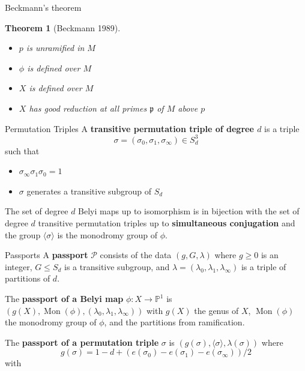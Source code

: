 \documentclass[handout,xcolor=dvipsnames]{beamer}
\theoremstyle{plain}
\newtheorem*{thm}{Theorem}
\newcommand{\PP}{\mathbb P}
\DeclareMathOperator{\Mon}{Mon}
\begin{document}
{\begin{frame}{Beckmann's theorem}
\begin{thm}[Beckmann 1989]
        \pause
        \begin{itemize}
          \item
            $p$ is unramified in $M$
          \item
            $\phi$ is defined over $M$
          \item
            $X$ is defined over $M$
          \item
            $X$ has good reduction at all
            primes $\mathfrak{p}$ of $M$
            above $p$
        \end{itemize}
      \end{thm}
    \end{frame}
    \begin{frame}{Permutation Triples}
      A \textbf{transitive permutation triple of degree $d$} is a triple
      \[
        \sigma = (\sigma_0, \sigma_1, \sigma_\infty)\in S_d^3
      \]
      such that
      \begin{itemize}
        \item
          $\sigma_\infty\sigma_1\sigma_0=1$
        \item
          $\sigma$ generates a transitive subgroup of $S_d$
      \end{itemize}
      \pause
      The set of degree $d$ Belyi maps up to isomorphism is in bijection with the
      set of degree $d$ transitive permutation triples up to
      \textbf{simultaneous conjugation} and
      the group $\langle\sigma\rangle$ is the monodromy group of $\phi$.
    \end{frame}
    \begin{frame}{Passports}
      A \textbf{passport} $\mathcal{P}$ consists of the data
      $(g,G,\lambda)$ where $g\geq 0$ is an integer,
      $G\leq S_d$ is a transitive subgroup,
      and $\lambda = (\lambda_0,\lambda_1,\lambda_\infty)$
      is a triple of partitions of $d$.
      \pause
      \par
      The \textbf{passport of a Belyi map} $\phi:X\to\PP^1$
      is $(g(X), \Mon(\phi), (\lambda_0,\lambda_1,\lambda_\infty))$
      with $g(X)$ the genus of $X$,
      $\Mon(\phi)$ the monodromy group of $\phi$,
      and the partitions from ramification.
      \pause
      \par
      The \textbf{passport of a permutation triple} $\sigma$ is
      $(g(\sigma), \langle\sigma\rangle, \lambda(\sigma))$
      where
      $$
      g(\sigma) = 1-d+(e(\sigma_0)-e(\sigma_1)-e(\sigma_\infty))/2
      $$
      with

\end{frame}}
\end{document}
